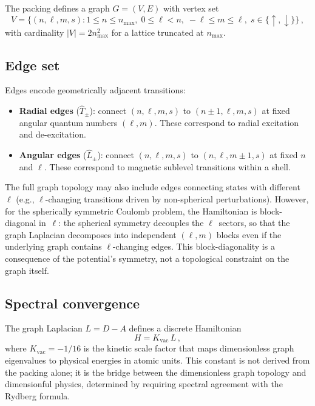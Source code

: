 \documentclass[aps,prl,reprint,amsmath,amssymb]{revtex4-2}
\begin{document}
The packing defines a graph $G = (V, E)$ with vertex set
\begin{equation}
  V = \bigl\{(n, \ell, m, s) : 1 \leq n \leq n_{\max},\;
      0 \leq \ell < n,\;
      -\ell \leq m \leq \ell,\;
      s \in \{\uparrow, \downarrow\}\bigr\} \,,
  \label{eq:vertex-set}
\end{equation}
with cardinality $|V| = 2n_{\max}^2$ for a lattice truncated at
$n_{\max}$.

\subsection{Edge set}

Edges encode geometrically adjacent transitions:
\begin{itemize}
\item \textbf{Radial edges} ($\hat{T}_{\pm}$): connect
  $(n, \ell, m, s)$ to $(n \pm 1, \ell, m, s)$ at fixed angular
  quantum numbers $(\ell, m)$.  These correspond to radial excitation
  and de-excitation.

\item \textbf{Angular edges} ($\hat{L}_{\pm}$): connect
  $(n, \ell, m, s)$ to $(n, \ell, m \pm 1, s)$ at fixed $n$ and
  $\ell$.  These correspond to magnetic sublevel transitions within a
  shell.
\end{itemize}

The full graph topology may also include edges connecting states with
different~$\ell$ (e.g., $\ell$-changing transitions driven by
non-spherical perturbations).  However, for the spherically symmetric
Coulomb problem, the Hamiltonian is block-diagonal in~$\ell$: the
spherical symmetry decouples the $\ell$~sectors, so that the graph
Laplacian decomposes into independent $(\ell, m)$ blocks even if the
underlying graph contains $\ell$-changing edges.  This
block-diagonality is a consequence of the potential's symmetry, not a
topological constraint on the graph itself.

\subsection{Spectral convergence}

The graph Laplacian $L = D - A$ defines a discrete Hamiltonian
\begin{equation}
  H = K_{\mathrm{vac}} \, L \,,
  \label{eq:graph-hamiltonian}
\end{equation}
where $K_{\mathrm{vac}} = -1/16$ is the kinetic scale factor that
maps dimensionless graph eigenvalues to physical energies in atomic
units.  This constant is not derived from the packing alone; it is the
bridge between the dimensionless graph topology and dimensionful
physics, determined by requiring spectral agreement with the Rydberg
formula.
\end{document}
